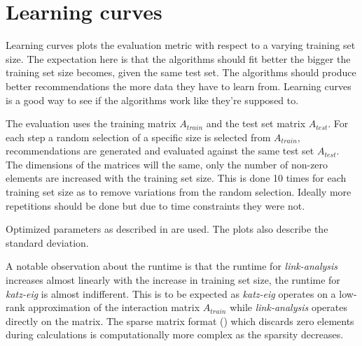 
\section{Learning curves}\label{sec:graphs:learning_curves}

Learning curves plots the evaluation metric with respect to a varying training set size. The expectation here is that the algorithms should fit better the bigger the training set size becomes, given the same test set. The algorithms should produce better recommendations the more data they have to learn from. Learning curves is a good way to see if the algorithms work like they're supposed to.

The evaluation uses the training matrix $A_{train}$ and the test set matrix $A_{test}$. For each step a random selection of a specific size is selected from $A_{train}$, recommendations are generated and evaluated against the same test set $A_{test}$. The dimensions of the matrices will the same, only the number of non-zero elements are increased with the training set size. This is done 10 times for each training set size as to remove variations from the random selection. Ideally more repetitions should be done but due to time constraints they were not.

Optimized parameters as described in  are used. The plots also describe the standard deviation.

\FloatBarrier

A notable observation about the runtime is that the runtime for \textit{link-analysis} increases almost linearly with the increase in training set size, the runtime for \textit{katz-eig} is almost indifferent. This is to be expected as \textit{katz-eig} operates on a low-rank approximation of the interaction matrix $A_{train}$ while \textit{link-analysis} operates directly on the matrix. The sparse matrix format () which discards zero elements during calculations is computationally more complex as the sparsity decreases.


